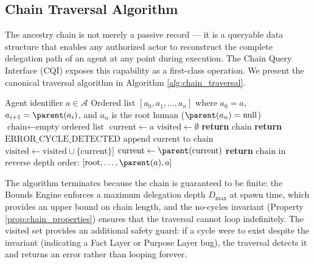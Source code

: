 \subsection{Chain Traversal Algorithm}

The ancestry chain is not merely a passive record — it is a queryable data structure that enables any authorized actor to reconstruct the complete delegation path of an agent at any point during execution. The Chain Query Interface (CQI) exposes this capability as a first-class operation. We present the canonical traversal algorithm in Algorithm \ref{alg:chain_traversal}.

\begin{algorithm}[htbp]
\caption{Chain Traversal — $\proc{GetAncestryChain}(a)$}
\label{alg:chain_traversal}
\begin{algorithmic}[1]
\Require Agent identifier $a \in \mathcal{A}$
\Ensure Ordered list $[a_0, a_1, \ldots, a_n]$ where $a_0 = a$, $a_{i+1} = \parent(a_i)$, and $a_n$ is the root human ($\parent(a_n) = \text{null}$)
\State $\text{chain} \gets \text{empty ordered list}$
\State $\text{current} \gets a$
\State $\text{visited} \gets \emptyset$ 
\Statex
\Loop
{}
    \State \textbf{return} $\text{chain}$ 
\EndIf
{}
    \State \textbf{return} $\text{ERROR\_CYCLE\_DETECTED}$ 
\EndIf
\State $\text{append current to chain}$ 
\State $\text{visited} \gets \text{visited} \cup \{\text{current}\}$]
\State $\text{current} \gets \parent(\text{current})$ 
\EndLoop
\Statex
{}
\State \textbf{return} $\text{chain}$ in reverse depth order: $[\text{root}, \ldots, \parent(a), a]$
\end{algorithmic}
\end{algorithm}

The algorithm terminates because the chain is guaranteed to be finite: the Bounds Engine enforces a maximum delegation depth $D_{\max}$ at spawn time, which provides an upper bound on chain length, and the no-cycles invariant (Property \ref{prop:chain_properties}) ensures that the traversal cannot loop indefinitely. The visited set provides an additional safety guard: if a cycle were to exist despite the invariant (indicating a Fact Layer or Purpose Layer bug), the traversal detects it and returns an error rather than looping forever.

